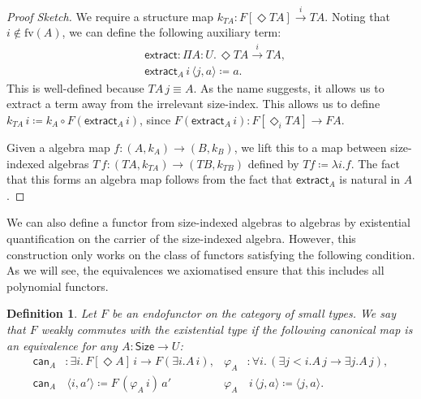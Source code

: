\documentclass[10pt,a4paper]{article}
\newtheorem{definition}[theorem]{Definition}
\theoremstyle{definition}
\theoremstyle{remark}
\renewcommand{\.}{.\,} %
\renewcommand{\:}{:} %
\newcommand{\brac}[1]{\langle {#1} \rangle }
\newcommand{\Size}{\mathsf{Size}}
\newcommand{\F}{F}
\newcommand{\sto}{\overset{i}{\to}}
\newcommand{\0}{\mathbf{0}}
\newcommand{\1}{\mathbf{1}}
\newcommand\<\langle
\renewcommand\>\rangle
\newcommand{\U}{U}
\theoremstyle{remark}
\begin{document}
\begin{proof}[Proof Sketch]
    We require a structure map \( k_{TA} : F[\Diamond TA] \sto TA \). Noting that \( i \notin \text{fv}(A) \), we can define the following auxiliary term:
    \begin{align*}
        & \mathsf{extract} : \Pi A:U \. \Diamond T A \sto TA, \\
        & \mathsf{extract}_A \, i \, \langle j, a \rangle \coloneqq  a
    .\end{align*}
    This is well-defined because $TA \, j \equiv A$. As the name suggests, it allows us to extract a term away from the irrelevant size-index.
    This allows us to define \( k_{TA} \, i \coloneqq k_A \circ F(\mathsf{extract}_A \, i)\), since $F(\mathsf{extract}_A \, i) : F[\Diamond_i TA] \to FA$.
    
    Given a algebra map \( f : (A, k_A) \to (B, k_B) \), we lift this to a map between size-indexed algebras \( T\,f : (TA, k_{TA}) \to (TB, k_{TB}) \) defined by \( Tf \coloneqq \lambda i . f \). The fact that this forms an algebra map follows from the fact that $\mathsf{extract}_A$ is natural in $A$.
\end{proof}

We can also define a functor from size-indexed algebras to algebras by existential quantification on the carrier of the size-indexed algebra.
However, this construction only works on the class of functors satisfying the following condition. As we will see, the equivalences we axiomatised ensure that this includes all polynomial functors.

\begin{definition}\label{def:weakly-commute-exist}
    Let $\F$ be an endofunctor on the category of small types. We say that $\F$ \emph{weakly commutes} with the existential type if the following canonical map is an equivalence for any $A : \Size \to \U$:
    \begin{align*}
    \mathsf{can}_A &: \exists i \. F [\Diamond A] \, i \to \F (\exists i .A \, i), & \varphi_A& : \forall i \. (\exists j < i . A \, j \to \exists j . A \, j), \\
    \mathsf{can}_A & \, \langle i, a' \rangle \coloneq  F \, (\varphi_A \, i) \, a' & \varphi_A& \, i \, \brac{j, a} \coloneq  \brac{j, a}.
    \end{align*}
\end{definition}
\end{document}
